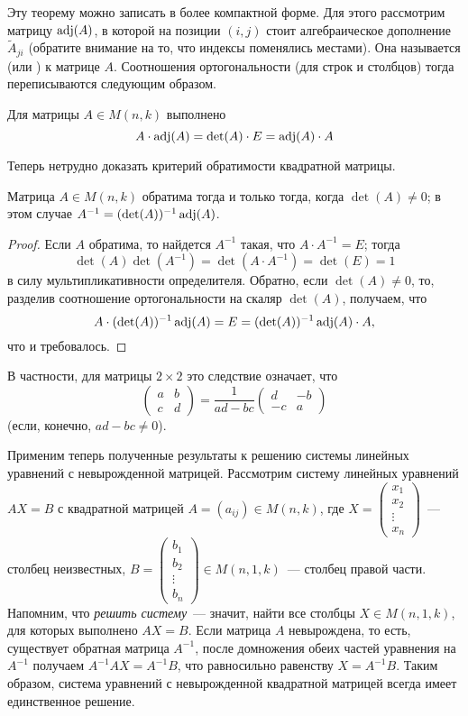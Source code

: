 Эту теорему можно записать в более компактной форме. Для этого
рассмотрим матрицу
$\operatorname{adj}(A)$, в которой на позиции $(i,j)$ стоит алгебраическое
дополнение $\widetilde{A}_{ji}$ (обратите внимание на то, что индексы
поменялись местами). Она называется
(или ) к матрице
$A$. Соотношения ортогональности (для
строк и столбцов) тогда
переписываются следующим образом.
\begin{corollary}\label{cor_orthogonality_relations}
Для матрицы $A\in M(n,k)$ выполнено
$$
A\cdot\operatorname{adj}(A)=\det(A)\cdot E = \operatorname{adj}(A)\cdot A
$$
\end{corollary}
Теперь нетрудно доказать критерий обратимости квадратной матрицы.
\begin{corollary}\label{cor_matrix_invertible_det}
Матрица $A\in M(n,k)$ обратима тогда и только тогда, когда
$\det(A)\neq 0$; в этом случае $A^{-1}=(\det(A))^{-1}\operatorname{adj}(A)$.
\end{corollary}
\begin{proof}
Если $A$ обратима, то найдется $A^{-1}$ такая, что $A\cdot A^{-1}=E$;
тогда $$\det(A)\det(A^{-1})=\det(A\cdot A^{-1})=\det(E)=1$$ в силу
мультипликативности определителя.
Обратно, если $\det(A)\neq 0$, то, разделив соотношение
ортогональности на скаляр $\det(A)$, получаем, что
$$A\cdot(\det(A))^{-1}\operatorname{adj}(A)=E=(\det(A))^{-1}\operatorname{adj}(A)\cdot A,$$
что и требовалось.
\end{proof}


В частности, для матрицы $2\times 2$ это следствие означает,
что
$$
\begin{pmatrix}a & b\\c & d\end{pmatrix}
= \frac{1}{ad-bc}\begin{pmatrix}d & -b\\-c & a\end{pmatrix}
$$
(если, конечно, $ad-bc\neq 0$).

 Применим теперь полученные результаты к решению системы линейных
уравнений с невырожденной матрицей.
Рассмотрим систему линейных уравнений $AX=B$ с квадратной матрицей
$A=(a_{ij})\in M(n,k)$, где
$X=\begin{pmatrix}x_1\\x_2\\\vdots\\x_n\end{pmatrix}$~--- столбец
неизвестных,
$B=\begin{pmatrix}b_1\\b_2\\\vdots\\b_n\end{pmatrix}\in M(n,1,k)$~---
столбец правой части. Напомним, что {\it решить систему}~--- значит,
найти все столбцы $X\in M(n,1,k)$, для которых выполнено $AX=B$.
Если матрица $A$ невырождена, то есть, существует обратная матрица
$A^{-1}$, после домножения обеих частей уравнения на $A^{-1}$ получаем
$A^{-1}AX=A^{-1}B$, что равносильно равенству $X=A^{-1}B$. Таким
образом, система уравнений с невырожденной квадратной матрицей всегда
имеет единственное решение.

